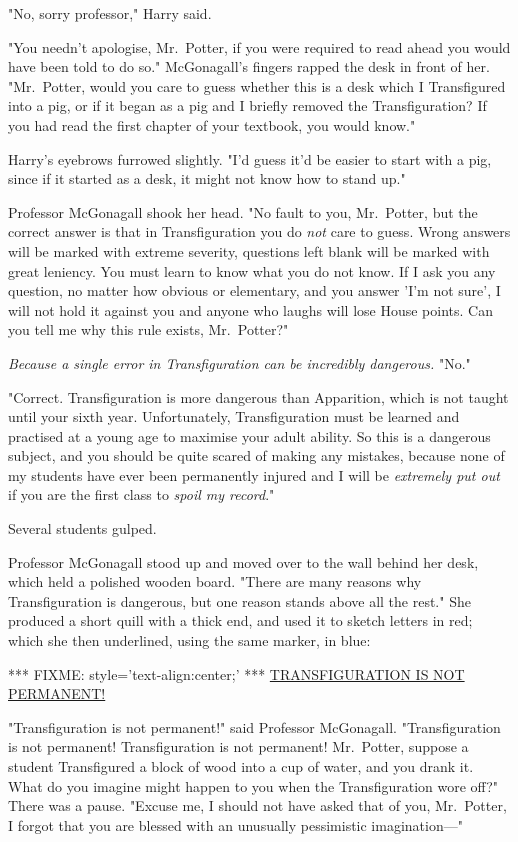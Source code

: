 "No, sorry professor," Harry said.

"You needn't apologise, Mr.~Potter, if you were required to read ahead you 
would have been told to do so." McGonagall's fingers rapped the desk in front 
of her. "Mr.~Potter, would you care to guess whether this is a desk which I 
Transfigured into a pig, or if it began as a pig and I briefly removed the 
Transfiguration? If you had read the first chapter of your textbook, you would 
know."

Harry's eyebrows furrowed slightly. "I'd guess it'd be easier to start with a 
pig, since if it started as a desk, it might not know how to stand up."

Professor McGonagall shook her head. "No fault to you, Mr.~Potter, but the 
correct answer is that in Transfiguration you do \emph{not} care to guess. 
Wrong answers will be marked with extreme severity, questions left blank will 
be marked with great leniency. You must learn to know what you do not know. If 
I ask you any question, no matter how obvious or elementary, and you answer 
'I'm not sure', I will not hold it against you and anyone who laughs will lose 
House points. Can you tell me why this rule exists, Mr.~Potter?"

\emph{Because a single error in Transfiguration can be incredibly dangerous.} 
"No."

"Correct. Transfiguration is more dangerous than Apparition, which is not 
taught until your sixth year. Unfortunately, Transfiguration must be learned 
and practised at a young age to maximise your adult ability. So this is a 
dangerous subject, and you should be quite scared of making any mistakes, 
because none of my students have ever been permanently injured and I will be 
\emph{extremely put out} if you are the first class to\emph{ spoil my record}."

Several students gulped.

Professor McGonagall stood up and moved over to the wall behind her desk, which 
held a polished wooden board. "There are many reasons why Transfiguration is 
dangerous, but one reason stands above all the rest." She produced a short 
quill with a thick end, and used it to sketch letters in red; which she then 
underlined, using the same marker, in blue:

*** FIXME: style='text-align:center;' ***
\underline{TRANSFIGURATION IS NOT PERMANENT!}

"Transfiguration is not permanent!" said Professor McGonagall. "Transfiguration 
is not permanent! Transfiguration is not permanent! Mr.~Potter, suppose a 
student Transfigured a block of wood into a cup of water, and you drank it. 
What do you imagine might happen to you when the Transfiguration wore off?" 
There was a pause. "Excuse me, I should not have asked that of you, Mr.~Potter, 
I forgot that you are blessed with an unusually pessimistic imagination---"

